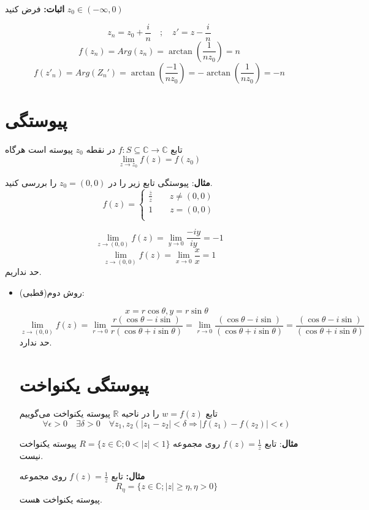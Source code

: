 \documentclass[12pt]{report}
\begin{document}
	 	 	 	  \textbf{اثبات:}
	 	 	 	  فرض کنید
	 	 	 	  $z_0 \in (- \infty , 0)$
	 	 	 	  
	 	 	 	  $$z_n = z_0 + \frac{i}{n} \quad ; \quad z' = z  - \frac{i}{n}$$
	 	 	 	  $$f(z_n) = Arg(z_n) = \arctan(\frac{1}{nz_0}) = n$$
	 	 	 	  $$f(z'_n) = Arg(Z_n') =\arctan(\frac{-1}{nz_0}) = -\arctan(\frac{1}{nz_0}) = -n$$	
	 	 	 	  
	 	 	 	  \section{پیوستگی}
	 	 	 	  تابع 
	 	 	 	  $f: S \subseteq \mathbb{C} \rightarrow \mathbb{C}$
	 	 	 	  در نقطه 
	 	 	 	  $z_0$
	 	 	 	  پیوسته است هرگاه
	 	 	 	  $$\lim_{z \to z_0} f(z) = f(z_0)$$
	 	 	 	  
	 	 	 	  \textbf{مثال}:
	 	 	 	  پیوستگی تابع زیر را در 
	 	 	 	  $z_0 = (0, 0)$
	 	 	 	  را بررسی کنید.
	 	 	 	  \[
	 	 	 	  f(z)=
	 	 	 	  \begin{cases}
	 	 	 	  	\frac{\bar{z}}{z} \qquad z \neq (0,0) \\
	 	 	 	  	1 \qquad z = (0,0)\\
	 	 	 	  \end{cases}
	 	 	 	  \]
	 	 	 	  
	 	 	 	  $$\lim_{z \to (0,0)} f(z) = \lim_{y \to 0} \frac{-iy}{iy} = -1$$
	 	 	 	  $$\lim_{z \to (0,0)} f(z) = \lim_{x \to 0} \frac{x}{x} = 1$$
	 	 	 	  حد نداریم.
	 	 	 	  
	 	 	 	  \begin{itemize}
	 	 	 	  	\item 
	 	 	 	  	روش دوم(قطبی):
	 	 	 	  	
	 	 	 	  	$$x = r\cos \theta , y = r\sin \theta$$
	 	 	 	  	$$\lim_{z \to (0,0)} f(z) = \lim_{r \to 0} \frac{r(\cos \theta - i\sin)}{r(\cos \theta + i \sin \theta)} = \lim_{r \to 0} \frac{(\cos \theta - i\sin)}{(\cos \theta + i \sin \theta)} = \frac{(\cos \theta - i\sin)}{(\cos \theta + i \sin \theta)}$$
	 	 	 	  	حد ندارد.
	 	 	 	  	\section{پیوستگی یکنواخت}
	 	 	 	  	تابع
	 	 	 	  	$w = f(z)$
	 	 	 	  	را در ناحیه 
	 	 	 	  	$\mathbb{R}$
	 	 	 	  	پیوسته یکنواخت می‌گوییم
	 	 	 	  	$$\forall \epsilon > 0 \quad \exists \delta > 0  \quad \forall z_1, z_2 (|z_1 - z_2| < \delta \Rightarrow |f(z_1) - f(z_2)| < \epsilon)$$
	 	 	 	  	
	 	 	 	  	\textbf{مثال}:
	 	 	 	  	تابع 
	 	 	 	  	$f(z) = \frac{1}{z}$
	 	 	 	  	روی مجموعه 
	 	 	 	  	$R = \{z \in \mathbb{C} ; 0<|z|<1\}$
 	 	 	  	پیوسته یکنواخت نیست.
 	 	 	  	
 	 	 	  	\textbf{مثال:}
 	 	 	  	تابع
	 	 	 	  		 	 	 	  	$f(z) = \frac{1}{z}$
	 	 	 	  	روی مجموعه
	 	 	 	  	$$R_\eta = \{z \in \mathbb{C} ; |z|\geq \eta , \eta > 0\}$$
	 	 	 	  	پیوسته یکنواخت هست.
	 	 	 	  \end{itemize}
 	 	 	  
\end{document}
